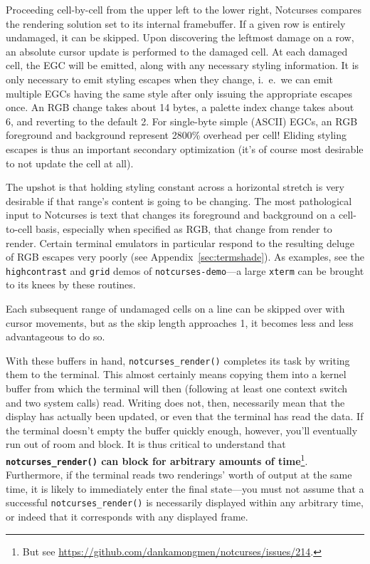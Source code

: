 \documentclass[letterpaper,10pt]{article}
\begin{document}
Proceeding cell-by-cell from the upper left to the lower right, Notcurses
compares the rendering solution set to its internal framebuffer. If a given row
is entirely undamaged, it can be skipped. Upon discovering the leftmost damage
on a row, an absolute cursor update is performed to the damaged cell. At each
damaged cell, the EGC will be emitted, along with any necessary styling
information. It is only necessary to emit styling escapes when they change, i.\ e.\ we
can emit multiple EGCs having the same style after only issuing the appropriate
escapes once. An RGB change takes about 14 bytes, a palette index change
takes about 6, and reverting to the default 2. For single-byte simple (ASCII)
EGCs, an RGB foreground and background represent 2800\% overhead per cell!
Eliding styling escapes is thus an important secondary optimization (it's of
course most desirable to not update the cell at all).

The upshot is that holding styling constant across a horizontal stretch is
very desirable if that range's content is going to be changing. The most
pathological input to Notcurses is text that changes its foreground and background
on a cell-to-cell basis, especially when specified as RGB, that change from
render to render. Certain terminal emulators in particular respond to the
resulting deluge of RGB escapes very poorly (see Appendix~\ref{sec:termshade}).
As examples, see the \texttt{highcontrast} and \texttt{grid} demos of
\texttt{notcurses-demo}---a large \texttt{xterm} can be brought to its knees
by these routines.

Each subsequent range of undamaged cells on a line can be skipped over with
cursor movements, but as the skip length approaches 1, it becomes less and
less advantageous to do so.

With these buffers in hand, \texttt{notcurses\_render()} completes its task by
writing them to the terminal. This almost certainly means copying
them into a kernel buffer from which the terminal will then (following at
least one context switch and two system calls) read. Writing does not,
then, necessarily mean that the display has actually been updated, or even
that the terminal has read the data. If the terminal doesn't empty the buffer
quickly enough, however, you'll eventually run out of room and block. It is
thus critical to understand that \textbf{\texttt{notcurses\_render()} can block
for arbitrary amounts of time}\footnote{But see
\url{https://github.com/dankamongmen/notcurses/issues/214}.}. Furthermore,
if the terminal reads two renderings' worth of output at the same time, it is
likely to immediately enter the final state---you must not assume that a successful
\texttt{notcurses\_render()} is necessarily displayed within any arbitrary time,
or indeed that it corresponds with any displayed frame.
\end{document}
